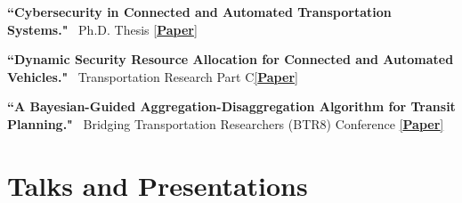 \documentclass[]{Keval-resume}
\begin{document}
\begin{cvitems}
\item
    {\textbf{``Cybersecurity in Connected and Automated Transportation Systems."}~ Ph.D. Thesis \hfill\href{https://deepblue.lib.umich.edu/bitstream/handle/2027.42/175624/yiyangw_1.pdf?sequence=1}{[\textbf{Paper}]}}
\item 
    {\textbf{``Dynamic Security Resource Allocation for Connected and Automated Vehicles."}~ Transportation Research Part C\hfill\href{https://www.sciencedirect.com/science/article/abs/pii/S0968090X25003560}{[\textbf{Paper}]}}
\item
    {\textbf{``A Bayesian-Guided Aggregation-Disaggregation Algorithm for Transit Planning."}~ Bridging Transportation Researchers (BTR8) Conference \hfill\href{https://www.researchgate.net/profile/Jisoon-Lim/publication/400258414_A_Bayesian-Guided_Aggregation-Disaggregation_Algorithm_for_Transit_Planning/links/697cfb4a12f837212a166204/A-Bayesian-Guided-Aggregation-Disaggregation-Algorithm-for-Transit-Planning.pdf}{[\textbf{Paper}]}}

\end{cvitems}
\sectionsep

\section{Talks and Presentations}
\hrulefill
\postsectionsep
\end{document}
